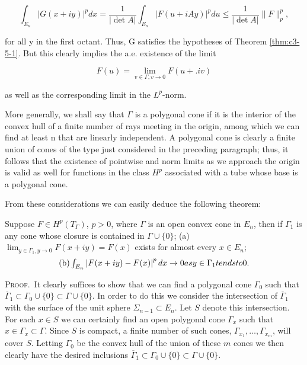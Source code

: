 \[
\int_{E_{n}}|G(x+i y)|^{p}d x=\frac{1}{|\det A|}\int_{E_{n}}|F(u+i A y)|^{p}d u\leq\frac{1}{|\det A|}\|F\|_{p}^{p},
\]

for all y in the first octant. Thus, G satisfies the hypotheses of Theorem \ref{thm:c3-5-1}. But this clearly implies the a.e. existence of the limit

\[
F(u)=\lim_{v\in\Gamma,v\to0}F(u+.iv)
\]

as well as the corresponding limit in the $L^{p}$-norm.

More generally, we shall say that $\Gamma$ is a polygonal cone if it is the interior of the convex hull of a finite number of rays meeting in the origin, among which we can find at least n that are linearly independent. A polygonal cone is clearly a finite union of cones of the type just considered in the preceding paragraph; thus, it follows that the existence of pointwise and norm limits as we approach the origin is valid as well for functions in the class $H^p$ associated with a tube whose base is a polygonal cone.

From these considerations we can easily deduce the following theorem:

\begin{theorem}
\label{thm:c3-5-5}
Suppose $F \in H^p(T_\Gamma)$, $p > 0$, where $\Gamma$ is an open convex cone in $E_n$, then if $\Gamma_1$ is any cone whose closure is contained in $\Gamma \cup \{0\}$;
(a) $\lim_{y \in \Gamma_1, y \to 0} F(x + iy) = F(x)$ exists for almost every $x \in E_n$;
\[
\begin{array}{r l}{\mathrm{(b) }\int_{E_{n}}\left|F(x+i y)-F(x)\right|^{p}d x\to0 {a s} y\in\Gamma_{1} tends t o 0.}\end{array}
\]

\end{theorem}

\textsc{Proof.}\ It clearly suffices to show that we can find a polygonal cone $\Gamma_0$ such that $\overline{\Gamma}_1 \subset \Gamma_0 \cup \{0\} \subset \Gamma \cup \{0\}$. In order to do this we consider the intersection of $\overline{\Gamma}_1$ with the surface of the unit sphere $\Sigma_{n-1} \subset E_n$. Let $S$ denote this intersection. For each $x \in S$ we can certainly find an open polygonal cone $\Gamma_x$ such that $x \in \Gamma_x \subset \Gamma$. Since $S$ is compact, a finite number of such cones, $\Gamma_{x_1}, \ldots, \Gamma_{x_m}$, will cover $S$. Letting $\Gamma_0$ be the convex hull of the union of these $m$ cones we then clearly have the desired inclusions $\overline{\Gamma}_1 \subset \Gamma_0 \cup \{0\} \subset \Gamma \cup \{0\}$.

